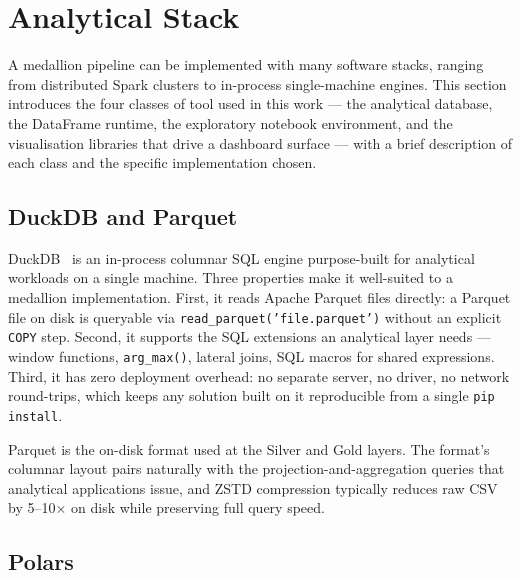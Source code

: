 \section{Analytical Stack}
\label{sec:theory:stack}

A medallion pipeline can be implemented with many software
stacks, ranging from distributed Spark clusters to in-process
single-machine engines. This section introduces the four
classes of tool used in this work --- the analytical database,
the DataFrame runtime, the exploratory notebook environment,
and the visualisation libraries that drive a dashboard surface
--- with a brief description of each class and the specific
implementation chosen.

\subsection{DuckDB and Parquet}
\label{sec:theory:duckdb}


\noindent
DuckDB~\cite{duckdb} is an in-process columnar SQL engine
purpose-built for analytical workloads on a single machine.
Three properties make it well-suited to a medallion
implementation. First, it reads Apache Parquet files
directly: a Parquet file on disk is queryable via
\texttt{read\_parquet('file.parquet')} without an explicit
\texttt{COPY} step. Second, it supports the SQL extensions an
analytical layer needs --- window functions,
\texttt{arg\_max()}, lateral joins, SQL macros for shared
expressions. Third, it has zero deployment overhead: no
separate server, no driver, no network round-trips, which
keeps any solution built on it reproducible from a single
\texttt{pip install}.

\medskip

Parquet is the on-disk format used at the Silver and Gold
layers. The format's columnar layout pairs naturally with the
projection-and-aggregation queries that analytical
applications issue, and ZSTD compression typically reduces raw
CSV by 5--10$\times$ on disk while preserving full query speed.

\subsection{Polars}
\label{sec:theory:polars}


